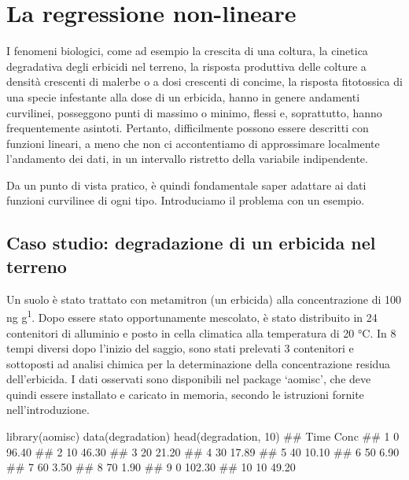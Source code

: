 \documentclass[a4paper,12pt,oneside]{book}
\newenvironment{Shaded}{}{}
\newcommand{\KeywordTok}[1]{#1}
\newcommand{\DecValTok}[1]{#1}
\newcommand{\CommentTok}[1]{#1}
\newcommand{\NormalTok}[1]{#1}
\begin{document}
\hypertarget{la-regressione-non-lineare}{%
\chapter{La regressione non-lineare}\label{la-regressione-non-lineare}}

I fenomeni biologici, come ad esempio la crescita di una coltura, la cinetica degradativa degli erbicidi nel terreno, la risposta produttiva delle colture a densità crescenti di malerbe o a dosi crescenti di concime, la risposta fitotossica di una specie infestante alla dose di un erbicida, hanno in genere andamenti curvilinei, posseggono punti di massimo o minimo, flessi e, soprattutto, hanno frequentemente asintoti. Pertanto, difficilmente possono essere descritti con funzioni lineari, a meno che non ci accontentiamo di approssimare localmente l'andamento dei dati, in un intervallo ristretto della variabile indipendente.

Da un punto di vista pratico, è quindi fondamentale saper adattare ai dati funzioni curvilinee di ogni tipo. Introduciamo il problema con un esempio.

\hypertarget{caso-studio-degradazione-di-un-erbicida-nel-terreno}{%
\section{Caso studio: degradazione di un erbicida nel terreno}\label{caso-studio-degradazione-di-un-erbicida-nel-terreno}}

Un suolo è stato trattato con metamitron (un erbicida) alla concentrazione di 100 ng g\textsuperscript{1}. Dopo essere stato opportunamente mescolato, è stato distribuito in 24 contenitori di alluminio e posto in cella climatica alla temperatura di 20 °C. In 8 tempi diversi dopo l'inizio del saggio, sono stati prelevati 3 contenitori e sottoposti ad analisi chimica per la determinazione della concentrazione residua dell'erbicida. I dati osservati sono disponibili nel package `aomisc', che deve quindi essere installato e caricato in memoria, secondo le istruzioni fornite nell'introduzione.

\begin{Shaded}
\begin{Highlighting}[]
\KeywordTok{library}\NormalTok{(aomisc)}
\KeywordTok{data}\NormalTok{(degradation)}
\KeywordTok{head}\NormalTok{(degradation, }\DecValTok{10}\NormalTok{)}
\CommentTok{##    Time   Conc}
\CommentTok{## 1     0  96.40}
\CommentTok{## 2    10  46.30}
\CommentTok{## 3    20  21.20}
\CommentTok{## 4    30  17.89}
\CommentTok{## 5    40  10.10}
\CommentTok{## 6    50   6.90}
\CommentTok{## 7    60   3.50}
\CommentTok{## 8    70   1.90}
\CommentTok{## 9     0 102.30}
\CommentTok{## 10   10  49.20}
\end{Highlighting}
\end{Shaded}
\end{document}
